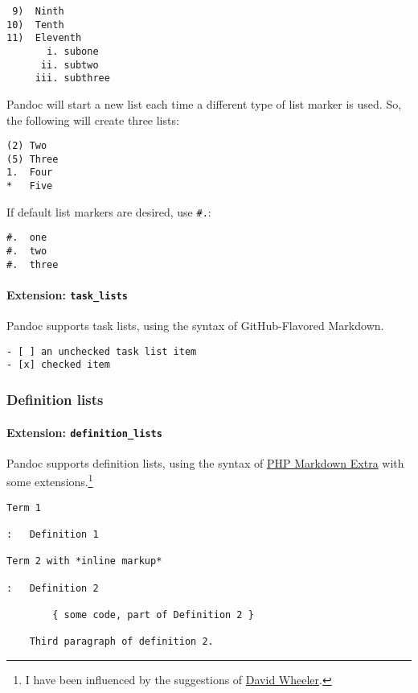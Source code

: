 \documentclass[
]{article}
\begin{document}
\begin{verbatim}
 9)  Ninth
10)  Tenth
11)  Eleventh
       i. subone
      ii. subtwo
     iii. subthree
\end{verbatim}

Pandoc will start a new list each time a different type of list marker
is used. So, the following will create three lists:

\begin{verbatim}
(2) Two
(5) Three
1.  Four
*   Five
\end{verbatim}

If default list markers are desired, use \texttt{\#.}:

\begin{verbatim}
#.  one
#.  two
#.  three
\end{verbatim}

\paragraph{\texorpdfstring{Extension:
\texttt{task\_lists}}{Extension: task\_lists}}\label{extension-task_lists}

Pandoc supports task lists, using the syntax of GitHub-Flavored
Markdown.

\begin{verbatim}
- [ ] an unchecked task list item
- [x] checked item
\end{verbatim}

\subsubsection{Definition lists}\label{definition-lists}

\paragraph{\texorpdfstring{Extension:
\texttt{definition\_lists}}{Extension: definition\_lists}}\label{extension-definition_lists}

Pandoc supports definition lists, using the syntax of
\href{https://michelf.ca/projects/php-markdown/extra/}{PHP Markdown
Extra} with some extensions.\footnote{I have been influenced by the
  suggestions of
  \href{https://justatheory.com/2009/02/modest-markdown-proposal/}{David
  Wheeler}.}

\begin{verbatim}
Term 1

:   Definition 1

Term 2 with *inline markup*

:   Definition 2

        { some code, part of Definition 2 }

    Third paragraph of definition 2.
\end{verbatim}
\end{document}
